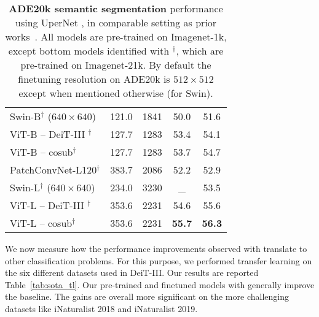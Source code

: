 \begin{table}
{\begin{tabular}{lcccc}
            Swin-B$^\dagger$ ($640\times 640$)  & 121.0 & 1841  & 50.0 & 51.6 \\
            ViT-B -- DeiT-III $^\dagger$  & 127.7 & 1283 & 53.4 & 54.1\\
            \rowcolor{blue!7}
            ViT-B -- cosub$^\dagger$  & 127.7 & 1283 & 53.7  & 54.7 \\
            PatchConvNet-L120$^\dagger$  & 383.7 & 2086  &  52.2 & 52.9   \\
            Swin-L$^\dagger$ ($640\times 640$)  & 234.0 & 3230  & \_ & 53.5 \\
            ViT-L -- DeiT-III $^\dagger$  & 353.6 & 2231 &  54.6 & 55.6 \\
            \rowcolor{blue!7}
            ViT-L -- cosub$^\dagger$  & 353.6 & 2231 & \textbf{55.7} & \textbf{56.3}  \\
        \bottomrule     
        \end{tabular}
        } 
            \vspace{-0.5em}
          \caption{\textbf{ADE20k semantic segmentation} performance using UperNet \cite{xiao2018unified},  in comparable setting as prior works~\cite{Dong2021CSWinTA,el2021xcit,liu2021swin}. 
          All models are pre-trained on Imagenet-1k,  except bottom models identified with $^\dagger$, which are pre-trained on Imagenet-21k. By default the finetuning resolution on ADE20k is $512\!\times\!512$ except when mentioned otherwise (for Swin).
       \label{tab:sem_seg}}
\end{table}

We now measure how the performance improvements observed with \ours  translate to other classification problems. For this purpose, we performed transfer learning on the six different datasets used in DeiT-III. 
Our results are reported Table~\ref{tab:sota_tl}. 
Our pre-trained and finetuned models with \ours generally improve the baseline. The gains are overall more significant on the more challenging datasets like iNaturalist 2018 and iNaturalist 2019.



